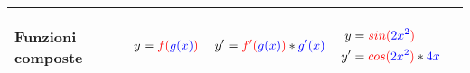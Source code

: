 \documentclass[../../main]{subfiles}
\begin{document}
\begin{center}
{\begin{tabular}{ |p{5em} | p{5em} | p{5em} | p{7em} | p{2cm}| }
            \hline
            
            \begin{center}
                Funzioni composte
            \end{center} &
            \begin{align}
                y= {\color{red}f({\color{blue}g(x)})} \nonumber
            \end{align}  &
            \begin{align}
                y'= {\color{red}f'({\color{blue}g(x)})} * {\color{blue}g'(x)} \nonumber
            \end{align} &
            {
                \begin{align}
                    y  &= {\color{red}sin({\color{blue}2x^2})}   \nonumber \\
                    y' &= {\color{red}cos({\color{blue}2x^2})} * {\color{blue}4x} \nonumber 
                \end{align}
            } &
            \begin{center}
            \end{center} \\ 

            \hline
            
        \end{tabular}
    }
\end{center}
\end{document}
